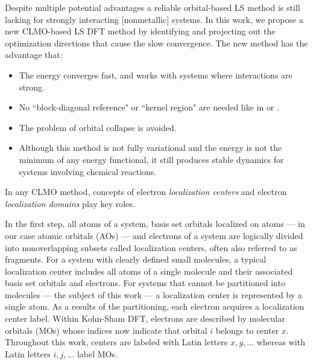 \documentclass[aps,prl,twocolumn,reprint,amsmath,amssymb]{revtex4-1}
\begin{document}
Despite multiple potential advantages a reliable orbital-based LS method is still lacking for strongly interacting [nonmetallic] systems. In this work, we propose a new CLMO-based LS DFT method by identifying and projecting out the optimization directions that cause the slow convergence. The new method has the advantage that: 
\begin{itemize}
\item The energy converges fast, and works with systems where interactions are strong.
\item No ``block-diagonal reference" or ``kernel region" are needed like in \cite{tsuchida2007augmented} or \cite{khaliullin2013efficient}.
\item The problem of orbital collapse is avoided. 
\item Although this method is not fully variational and the energy is not the minimum of any energy functional, it still produces stable dynamics for systems involving chemical reactions. 

\end{itemize}

\label{marker:theory} 
In any CLMO method, concepts of electron \emph{localization centers} and electron \emph{localization domains} play key roles. 

In the first step, all atoms of a system, basis set orbitals localized on atoms --- in our case atomic orbitals (AOs) --- and electrons of a system are logically divided into nonoverlapping subsets called localization centers, often also referred to as fragments. For a system with clearly defined small molecules, a typical localization center includes all atoms of a single molecule and their associated basis set orbitals and electrons. For systems that cannot be partitioned into molecules --- the subject of this work --- a localization center is represented by a single atom. As a results of the partitioning, each electron acquires a localization center label. Within Kohn-Sham DFT, electrons are described by molecular orbitals (MOs)  whose indices now indicate that orbital $i$ belongs to center $x$. Throughout this work, centers are labeled with Latin letters $x,y,\ldots$ whereas with Latin letters $i,j,\ldots$ label MOs. 
\end{document}
